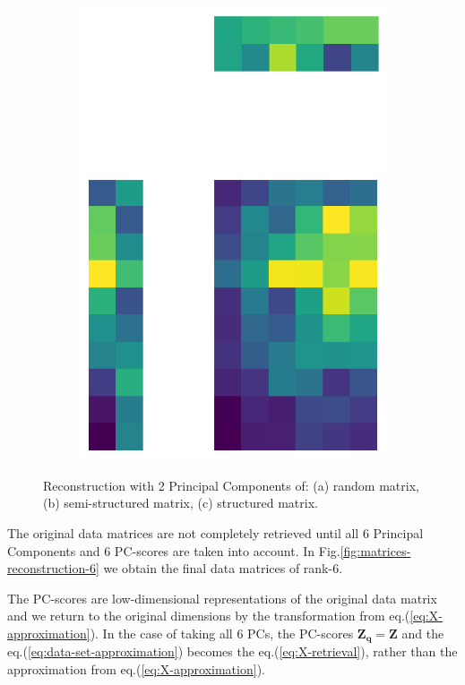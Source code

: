 \documentclass[10pt,twocolumn]{article}
\begin{document}
\begin{figure}[H]
\begin{subfigure}[t]{.15\textwidth}
\includegraphics[scale=.2]{structured-matrix-reconstruction-PCs-2.png}
\caption{ }
\end{subfigure}
\caption{Reconstruction with 2 Principal Components of: (a) random matrix, (b) semi-structured matrix, (c) structured matrix.}
\label{fig:matrices-reconstruction-2}
\end{figure}

The original data matrices are not completely retrieved until all 6 Principal Components and 6 PC-scores are taken into account. In Fig.\ref{fig:matrices-reconstruction-6} we obtain the final data matrices of rank-6.

The PC-scores are low-dimensional representations of the original data matrix and we return to the original dimensions by the transformation from eq.(\ref{eq:X-approximation}). In the case of taking all 6 PCs, the PC-scores $\bm{Z_q} = \bm{Z}$ and the eq.(\ref{eq:data-set-approximation}) becomes the eq.(\ref{eq:X-retrieval}), rather than the approximation from eq.(\ref{eq:X-approximation}).
\end{document}
